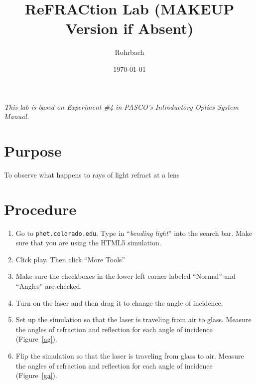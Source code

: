 \documentclass[10pt]{exam}
\title{ReFRACtion Lab (MAKEUP Version if Absent)}
\author{Rohrbach}
\date{\today}
\begin{document}
\maketitle

\noindent
{\small \it This lab is based on Experiment \#4 in PASCO's Introductory Optics System Manual.}

\section*{Purpose} To observe what happens to rays of light refract at a lens

\vspace{-1em}

\section*{Procedure}
\begin{enumerate}
  \item Go to \texttt{phet.colorado.edu}.  Type in ``\emph{bending light}'' into the search bar.  Make sure that you are using the HTML5 simulation.
  \item	Click play.  Then click “More Tools”
  \item	Make sure the checkboxes in the lower left corner labeled “Normal” and “Angles” are checked.
  \item Turn on the laser and then drag it to change the angle of incidence. 
  \item Set up the simulation so that the laser is traveling from air to glass.  Measure the angles of refraction and reflection for each angle of incidence (Figure~\ref{ag}).
  \item Flip the simulation so that the laser is traveling from glass to air.  Measure the angles of refraction and reflection for each angle of incidence (Figure~\ref{ga}).
  
\end{enumerate}
\end{document}

